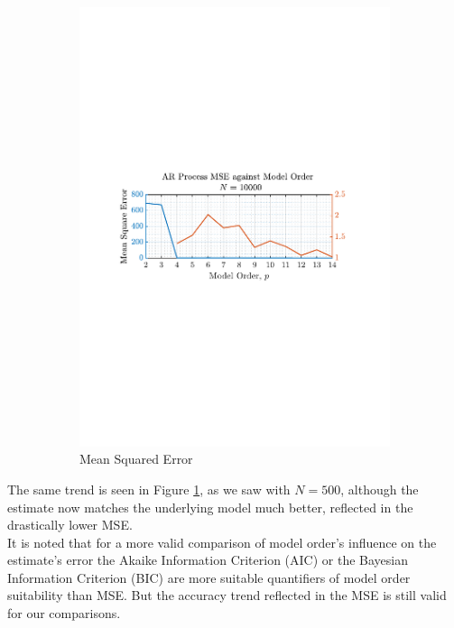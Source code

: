 \documentclass[12pt]{article}
\begin{document}
\begin{figure}[H]
\begin{subfigure}{0.49\textwidth}
			\includegraphics[trim={2.2cm 11.2cm 3cm  11.2cm}, clip, width=\textwidth]{../MATLAB/figures/q1_4c_fig16.pdf} 
			\captionsetup{justification=centering}
			\caption{Mean Squared Error}
		\end{subfigure}
		\captionsetup{justification=centering}
		\caption{}
		\label{fig: 1-4c}
	\end{figure}

	The same trend is seen in Figure \ref{fig: 1-4c}, as we saw with $N=500$, although the estimate now matches the underlying model much better, reflected in the drastically lower MSE. \\
	
	It is noted that for a more valid comparison of model order's influence on the estimate's error the Akaike Information Criterion (AIC) or the Bayesian Information Criterion (BIC) are more suitable quantifiers of model order suitability than MSE. But the accuracy trend reflected in the MSE is still valid for our comparisons.
	
\end{document}
